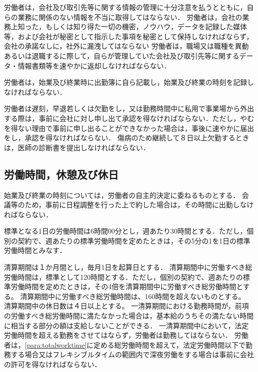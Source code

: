 \documentclass[11pt,a4paper]{jsarticle}
\begin{document}
労働者は，会社及び取引先等に関する情報の管理に十分注意を払うとともに，自らの業務に関係のない情報を不当に取得してはならない．
\label{para:confidentiality}
\term
労働者は，会社の業務上知った，もしくは知り得た一切の機密，ノウハウ，データを記録した媒体等，および会社が秘密として指示した事項を秘密として保持しなければならず，会社の承諾なしに，社外に漏洩してはならない
\term
労働者は，職場又は職種を異動あるいは退職するに際して，自らが管理していた会社及び取引先等に関するデータ・情報書類等を速やかに返却しなければならない．

労働者は，始業及び終業時に出勤簿に自ら記載し，始業及び終業の時刻を記録しなければならない．

労働者は遅刻，早退若しくは欠勤をし，又は勤務時間中に私用で事業場から外出する際は，事前に会社に対し申し出て承認を得なければならない．ただし，やむを得ない理由で事前に申し出ることができなかった場合は，事後に速やかに届出をし，承認を得なければならない．
\term
傷病のため継続して８日以上欠勤するときは，医師の診断書を提出しなければならない．




\subsection{労働時間，休憩及び休日}

始業及び終業の時刻については，労働者の自主的決定に委ねるものとする．
\term
会議等のため，事前に日程調整を行った上で約した場合は，その時間に出勤しなければならない．

標準となる1日の労働時間は6時間00分とし，週あたり30時間とする．ただし，個別の契約で、週あたりの標準労働時間を定めたときは，その5分の1を1日の標準労働時間とみなす．

清算期間は１か月間とし，毎月1日を起算日とする． 
\term
清算期間中に労働すべき総労働時間は，標準として120時間とする．ただし，個別の契約で、週あたりの標準労働時間を定めたときは，その4倍を清算期間中に労働すべき総労働時間とする。
\term
清算期間中に労働すべき総労働時間は、160時間を超えないものとする。
\term
清算期間中の休日数は４日以上とする。
\term
一清算期間における勤務時間が，前項の労働すべき総労働時間に満たなかった場合は，基本給のうちその満たない時間に相当する部分の額は支給しないことができる．
\label{para:totalworktime}
\term
一清算期間中において，法定労働時間を超える勤務をさせてはならず，労働者は勤務してはならない．
\term
労働者は，\ref{para:totalworktime}に定める総労働時間を超えて，法定労働時間以下で勤務する場合又はフレキシブルタイムの範囲内で深夜労働をする場合は事前に会社の許可を得なければならない．
\end{document}
